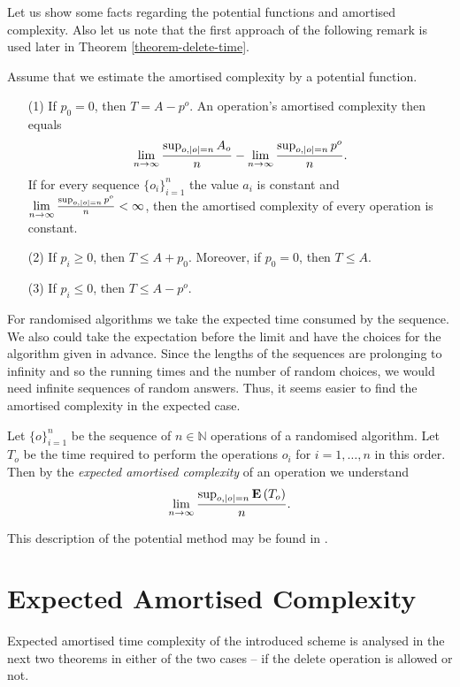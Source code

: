 Let us show some facts regarding the potential functions and amortised complexity. Also let us note that the first approach of the following remark is used later in Theorem \ref{theorem-delete-time}.
\begin{claim}
\label{claim-amortised-complexity}
Assume that we estimate the amortised complexity by a potential function.
\begin{enumerate}
\item [(1)] If $p_0 = 0$, then $T = A - p^o$. An operation's amortised complexity then equals \[ \lim\limits_{n \rightarrow \infty} \frac{\sup\displaylimits_{o, |o| = n} A_o}{n} - \lim\limits_{n \rightarrow \infty} \frac{\sup\displaylimits_{o, |o| = n} p^o}{n} \text{.} \] If for every sequence $\{o_i\}_{i = 1}^{n}$ the value $a_i$ is constant and $\lim\limits_{n \rightarrow \infty} \frac{\sup\displaylimits_{o, |o| = n} p^o}{n} < \infty$, then the amortised complexity of every operation is constant.
\item [(2)] If $p_i \geq 0$, then $T \leq A + p_0$. Moreover, if $p_0 = 0$, then $T \leq A$.
\item [(3)] If $p_i \leq 0$, then $T \leq A - p^o$.
\end{enumerate}
\end{claim}

For randomised algorithms we take the expected time consumed by the sequence. We also could take the expectation before the limit and have the choices for the algorithm given in advance. Since the lengths of the sequences are prolonging to infinity and so the running times and the number of random choices, we would need infinite sequences of random answers. Thus, it seems easier to find the amortised complexity in the expected case.

\begin{definition}
Let $\{o\}_{i = 1}^{n}$ be the sequence of $n \in \mathbb{N}$ operations of a randomised algorithm. Let $T_o$ be the time required to perform the operations $o_i$ for $i = 1, \dots, n$ in this order. Then by the \emph{expected amortised complexity} of an operation we understand \[ \lim\limits_{n \rightarrow \infty}\frac{\sup_{o, |o| = n}\mathbf{E}\left(T_o\right)}{n} \text{.} \]
\end{definition}

This description of the potential method may be found in \cite{VK-skripta}.

\section{Expected Amortised Complexity}
Expected amortised time complexity of the introduced scheme is analysed in the next two theorems in either of the two cases -- if the delete operation is allowed or not.

